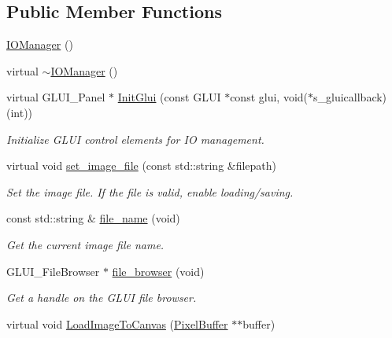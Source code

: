 \subsection*{Public Member Functions}
\begin{DoxyCompactItemize}
\item 
\hyperlink{classimage__tools_1_1IOManager_a1da65dc01035ee74b62650fa49e1a997}{I\+O\+Manager} ()
\item 
virtual \hyperlink{classimage__tools_1_1IOManager_ac41c9bb3b02138cafed782eae4de4b9b}{$\sim$\+I\+O\+Manager} ()
\item 
virtual G\+L\+U\+I\+\_\+\+Panel $\ast$ \hyperlink{classimage__tools_1_1IOManager_a5038100a2a640a3343c4715101eec120}{Init\+Glui} (const G\+L\+UI $\ast$const glui, void($\ast$s\+\_\+gluicallback)(int))
\begin{DoxyCompactList}\small\item\em Initialize G\+L\+UI control elements for IO management. \end{DoxyCompactList}\item 
virtual void \hyperlink{classimage__tools_1_1IOManager_a9ddac98843256d25442aba6c963e144a}{set\+\_\+image\+\_\+file} (const std\+::string \&filepath)
\begin{DoxyCompactList}\small\item\em Set the image file. If the file is valid, enable loading/saving. \end{DoxyCompactList}\item 
const std\+::string \& \hyperlink{classimage__tools_1_1IOManager_a667da573afc3fc0977408a0bf669f448}{file\+\_\+name} (void)
\begin{DoxyCompactList}\small\item\em Get the current image file name. \end{DoxyCompactList}\item 
G\+L\+U\+I\+\_\+\+File\+Browser $\ast$ \hyperlink{classimage__tools_1_1IOManager_ab58911faeeb831cc1f62aec390718469}{file\+\_\+browser} (void)
\begin{DoxyCompactList}\small\item\em Get a handle on the G\+L\+UI file browser. \end{DoxyCompactList}\item 
virtual void \hyperlink{classimage__tools_1_1IOManager_a05f34b157208a8d27d6f9d8bf7a20384}{Load\+Image\+To\+Canvas} (\hyperlink{classimage__tools_1_1PixelBuffer}{Pixel\+Buffer} $\ast$$\ast$buffer)\hypertarget{classimage__tools_1_1IOManager_a05f34b157208a8d27d6f9d8bf7a20384}{}\label{classimage__tools_1_1IOManager_a05f34b157208a8d27d6f9d8bf7a20384}


\end{DoxyCompactItemize}
